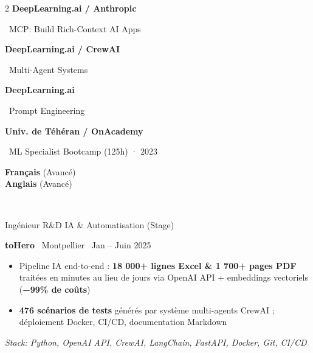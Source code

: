 \documentclass[7pt,a4paper,withhyper]{altacv}
\renewcommand{\cvevent}[4]{%
  {\large\color{emphasis}\raggedright #1\par}
  \smallskip\normalsize
  \ifstrequal{#2}{}{}{%
    \textbf{\color{accent}#2}%
  }%
  \ifstrequal{#4}{}{}{%
    \ifstrequal{#2}{}{}{\hspace{1.5em}}%
    {\small\cvLocationMarker~#4}%
  }%
  \ifstrequal{#3}{}{}{%
    \hfill{\small\cvDateMarker~#3}%
  }\par
}
\begin{document}
\begin{paracol}{2}
\vspace{0.2em}
\smallskip
\noindent\textbf{DeepLearning.ai / Anthropic}\par
\hspace{1em}\raisebox{0.15ex}{\textcolor{accent}{\scriptsize\faStar}}~MCP: Build Rich-Context AI Apps\par
\vspace{0.2em}
\noindent\textbf{DeepLearning.ai / CrewAI}\par
\hspace{1em}\raisebox{0.15ex}{\textcolor{accent}{\scriptsize\faStar}}~Multi-Agent Systems\par
\vspace{0.2em}
\noindent\textbf{DeepLearning.ai}\par
\hspace{1em}\raisebox{0.15ex}{\textcolor{accent}{\scriptsize\faStar}}~Prompt Engineering\par
\vspace{0.2em}
\noindent\textbf{Univ. de Téhéran / OnAcademy}\par
\hspace{1em}\raisebox{0.15ex}{\textcolor{accent}{\scriptsize\faStar}}~ML Specialist Bootcamp (125h) · 2023\par
\hspace{1em}{Python ML · Neural Networks · Computer Vision}\par

\vspace{0.2em}
\textbf{Français} (Avancé)\\\vspace{0.1em}
\textbf{Anglais} (Avancé)\\\vspace{0.1em}\par

\vspace{0.2em}
 \\[-0.15em]
 \par

\switchcolumn
\vspace{-0.5em}


\cvevent{Ingénieur R\&D IA \& Automatisation (Stage)}{toHero}{Jan – Juin 2025}{Montpellier}
\smallskip
\begin{itemize}[leftmargin=1.25em, itemsep=0pt, parsep=0pt]
\item \justifying Pipeline IA end-to-end : \textbf{18 000+ lignes Excel \& 1 700+ pages PDF} traitées en minutes au lieu de jours via OpenAI API + embeddings vectoriels (\textbf{−99\% de coûts})
\item \justifying \textbf{476 scénarios de tests} générés par système multi-agents CrewAI ; déploiement Docker, CI/CD, documentation Markdown
\end{itemize}
\smallskip\noindent\textit{Stack: Python, OpenAI API, CrewAI, LangChain, FastAPI, Docker, Git, CI/CD}\par


\end{paracol}
\end{document}
